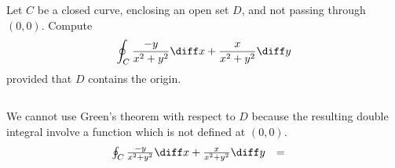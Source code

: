 \begin{frame}
\begin{example}
\begin{columns}

Let $C$ be a closed curve, enclosing an open set $D$, and not passing through $(0,0)$. Compute 
\[
\oint_C \frac{-y}{x^2+y^2}\diff x + \frac{x}{x^2+y^2}\diff y
\]
provided that $D$ contains the origin.
\end{columns}
We cannot use Green's theorem with respect to $D$ because the resulting double integral involve a function which is not defined at $(0,0)$.
\[
\begin{array}{rcl}
\oint_C \frac{-y}{x^2+y^2}\diff x + \frac{x}{x^2+y^2}\diff y&=& 
\end{array}
\]
\end{example}
\end{frame}
